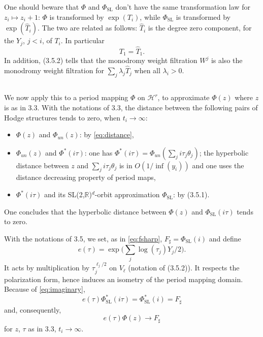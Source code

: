 \documentclass[11pt,a4paper]{article}
\theoremstyle{plain}
\theoremstyle{definition}
\DeclareMathOperator{\SL}{SL}
\begin{document}
One should beware that $\Phi$ and $\Phi_{\SL}$ don't have the same transformation law for $z_i\mapsto z_i+1$: $\Phi$ is transformed by $\exp(T_i)$, while $\Phi_{\SL}$ is transformed by $\exp(\hat{T}_i)$. The two are related as follows: $\hat{T}_i$ is the degree zero component, for the $Y_j$, $j<i$, of $T_i$. In particular
\begin{equation}\label{eq:t1hat}
T_1=\hat{T}_1.
\end{equation}
In addition, (3.5.2) tells that the monodromy weight filtration $W^j$ is also the monodromy weight filtration for $\sum_j\lambda_j\hat{T}_j$ when all $\lambda_i>0$.

\subsection{}
We now apply this to a period mapping $\Phi$ on $\mathcal{H}^r$, to approximate $\Phi(z)$ where $z$ is as in 3.3. With the notations of 3.3, the distance between the following pairs of Hodge structures tends to zero, when $t_i\to\infty$:
\begin{itemize}
\item[(a)] $\Phi(z)$ and $\Phi_{un}(z)$: by \eqref{eq:distance},
\item[(b)] $\Phi_{un}(z)$ and $\Phi^*(i\tau)$: one has $\Phi^*(i\tau)=\Phi_{un}(\sum_j i\tau_j\theta_j)$; the hyperbolic distance between $z$ and $\sum_j i\tau_j\theta_j$ is in $O(1/\inf(y_i))$ and one uses the distance decreasing property of period maps,
\item[(c)] $\Phi^*(i\tau)$ and its SL(2,$\mathbb{R}$)$^d$-orbit approximation $\Phi_{\SL}$: by (3.5.1).
\end{itemize}
One concludes that the hyperbolic distance between $\Phi(z)$ and $\Phi_{\SL}(i\tau)$ tends to zero.

With the notations of 3.5, we set, as in \eqref{eq:fsharp}, $F_{\sharp}=\Phi_{\SL}(i)$ and define
\begin{equation}\label{eq:etau}
e(\tau)=\exp\bigl(\sum_j\log(\tau_j)Y_j/2\bigr).
\end{equation}
It acts by multiplication by $\tau_j^{\ell_j/2}$ on $V_{\ell}$ (notation of (3.5.2)). It respects the polarization form, hence induces an isometry of the period mapping domain. Because of \eqref{eq:imaginary},
\[
e(\tau)\Phi^*_{\SL}(i\tau)=\Phi^*_{\SL}(i)=F_{\sharp}
\]
and, consequently,
\begin{equation}\label{eq:etauconverge}
e(\tau)\Phi(z)\to F_{\sharp}
\end{equation}
for $z$, $\tau$ as in 3.3, $t_i\to\infty$.
\end{document}
